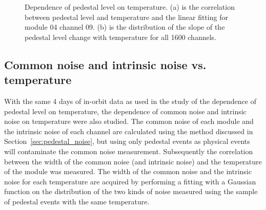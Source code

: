 \documentclass[preprint,sort&compress,12pt]{elsarticle}
\begin{document}
\begin{figure}[!ht]
\centering
{}
\hspace{2mm}
\caption{Dependence of pedestal level on temperature. (a) is the correlation between pedestal level and temperature and the linear fitting for module 04 channel 09. (b) is the distribution of the slope of the pedestal level change with temperature for all 1600 channels.}\label{fig:ped_vs_temp}
\end{figure}

\subsection{Common noise and intrinsic noise vs. temperature}

With the same 4 days of in-orbit data as used in the study of the dependence of pedestal level on temperature, the dependence of common noise and intrinsic noise on temperature were also studied. The common noise of each module and the intrinsic noise of each channel are calculated using the method discussed in Section~\ref{sec:pedestal_noise}, but using only pedestal events as physical events will contaminate the common noise measurement. Subsequently the correlation between the width of the common noise (and intrinsic noise) and the temperature of the module was measured. The width of the common noise and the intrinsic noise for each temperature are acquired by performing a fitting with a Gaussian function on the distribution of the two kinds of noise measured using the sample of pedestal events with the same temperature. 
\end{document}
